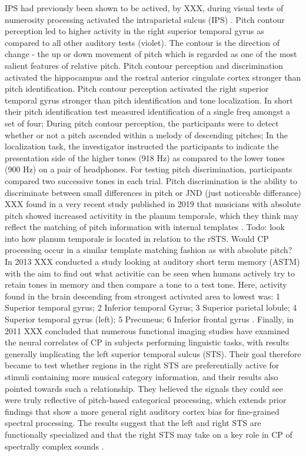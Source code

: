 IPS had previously been shown to be actived, by XXX, during visual tests of  numerosity processing activated the intraparietal sulcus (IPS) \cite{castelli2006discrete}.
Pitch contour perception led to higher activity in the right superior temporal gyrus as compared to all other auditory tests (violet). The contour is the direction of change - the up or down movement of pitch which is regarded as one of the most salient features of relative pitch.
Pitch contour perception and discrimination activated the hippocampus and the rostral anterior cingulate cortex stronger than pitch identification. Pitch contour perception activated the right superior temporal gyrus stronger than pitch identification and tone localization.
In short their pitch identification test measured identification of a single freq amongst a set of four; During pitch contour perception, the participants were to detect whether or not a pitch ascended within a melody of descending pitches; In the localization task, the investigator instructed the participants to indicate the presentation side of the higher tones (918 Hz) as compared to the lower tones (900 Hz) on a pair of headphones.
For testing pitch discrimination, participants compared two successive tones in each trial. Pitch discrimination is the ability to discriminate between small differences in pitch or JND (just noticeable differance) \cite{schwenzer2011numeric}
XXX found in a very recent study published in 2019 that musicians with absolute pitch showed increased activitity in the planum temporale, which they think may reflect the matching of pitch information with internal templates \cite{leipold2019absolute}.
Todo: look into how planum temporale is located in relation to the rSTS. Would CP processing occur in a similar template matching fashion as with absolute pitch?
In 2013 XXX conducted a study looking at auditory short term memory (ASTM) with the aim to find out what activitie can be seen when humans actively try to retain tones in memory and then compare a tone to a test tone. Here, activity found in the brain descending from strongest activated area to lowest was: 1  Superior temporal gyrus; 2  Inferior temporal Gyrus; 3 Superior parietal lobule; 4 Superior temporal gyrus (left); 5 Precuneus; 6  Inferior frontal gyrus \cite{nolden2013retention}.
Finally, in 2011 XXX concluded that numerous functional imaging studies have examined the neural correlates of CP in subjects performing linguistic tasks, with results generally implicating the left superior temporal sulcus (STS). Their goal therefore became to test whether regions in the right STS are preferentially active for stimuli containing more musical category information, and their results also pointed towards such a relationship. They believed the signals they could see were truly reflective of pitch-based categorical processing, which extends prior findings that show a more general right auditory cortex bias for fine-grained spectral processing. The results suggest that the left and right STS are functionally specialized and that the right STS may take on a key role in CP of spectrally complex sounds \cite{klein2011role}.

